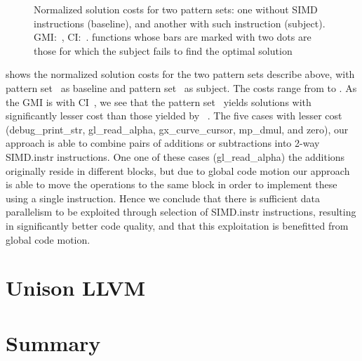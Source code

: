 

\begin{figure}
  \centering%
  \maxsizebox{\textwidth}{!}{%
    \trimBarchartPlot{%
    }%
  }

  \caption[Plot for evaluating the impact on SIMD instructions on code quality]%
          {%
            Normalized solution costs for two pattern sets: one without SIMD
            instructions (baseline), and another with such instruction
            (subject).
            GMI:~\printGMI{%
              \SimdVsWithoutCyclesSpeedupCyclesRegularSpeedupGmean%
            },
            CI:~\printGMICI{%
              \SimdVsWithoutCyclesSpeedupCyclesRegularSpeedupCiMin%
            }{%
              \SimdVsWithoutCyclesSpeedupCyclesRegularSpeedupCiMax%
            }.
            \Glspl{function} whose bars are marked with two dots are those
            for which the \gls{subject} fails to find the optimal solution%
          }
\end{figure}

 shows the normalized \gls{solution}
costs for the two \glspl{pattern set} describe above, with \gls{pattern
  set}~\patternSetA{} as \gls{baseline} and \gls{pattern set}~\patternSetB{} as
\gls{subject}.
%
The costs range from
\printMinCycles{%
  \SimdVsWithoutCyclesSpeedupCyclesAvgMin,
  \SimdVsWithoutCyclesSpeedupBaselineCyclesAvgMin
}to
\printMaxCycles{%
  \SimdVsWithoutCyclesSpeedupCyclesAvgMax,
  \SimdVsWithoutCyclesSpeedupBaselineCyclesAvgMax
}.
%
As the \gls{GMI} is \printGMI{%
  \SimdVsWithoutCyclesSpeedupCyclesRegularSpeedupGmean%
} with \gls{CI}~\printGMICI{%
  \SimdVsWithoutCyclesSpeedupCyclesRegularSpeedupCiMin%
}{%
  \SimdVsWithoutCyclesSpeedupCyclesRegularSpeedupCiMax%
}, we see that the \gls{pattern set}~\patternSetB{} yields \glspl{solution} with
significantly lesser cost than those yielded by ~\patternSetA.
%
The five cases with lesser cost ({\codeFont debug\_print\_str}, {\codeFont
  gl\_read\_alpha}, {\codeFont gx\_curve\_cursor}, {\codeFont mp\_dmul}, and
{\codeFont zero}), our approach is able to combine pairs of additions or
subtractions into \num{2}-way \gls{SIMD.instr} \glspl{instruction}.
%
One one of these cases ({\codeFont gl\_read\_alpha}) the additions originally
reside in different \glspl{block}, but due to \gls{global code motion} our
approach is able to move the operations to the same block in order to implement
these using a single \gls{instruction}.
%
Hence we conclude that there is sufficient data parallelism to be exploited
through selection of \gls{SIMD.instr} \glspl{instruction}, resulting in
significantly better code quality, and that this exploitation is benefitted from
\gls{global code motion}.


\section{Unison \versus LLVM}


\section{Summary}
